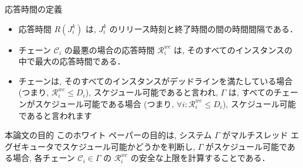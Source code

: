 \begin{frame}{応答時間の定義}
    \begin{itemize}
        \item 応答時間 $R\left(J_{i}^{k}\right)$ は,  $J_{i}^{k}$ のリリース時刻と終了時間の間の時間間隔である．
        \item チェーン $\mathcal{C}_{i}$ の最悪の場合の応答時間 $\mathcal{R}_{i}^{w c}$ は, そのすべてのインスタンスの中で最大の応答時間である．
        \item チェーンは, そのすべてのインスタンスがデッドラインを満たしている場合 (つまり, $\mathcal{R}_{i}^{w c} \leq D_{i}$), スケジュール可能であると言われ, $\Gamma$ は, すべてのチェーンがスケジュール可能である場合 (つまり, $\forall i: \mathcal{R}_{i}^{w c} \leq D_{i}$), スケジュール可能であると言われます
    \end{itemize}
\end{frame}

\begin{frame}{本論文の目的}
    このホワイト ペーパーの目的は, システム $\Gamma$ がマルチスレッド エグゼキュータでスケジュール可能かどうかを判断し, $\Gamma$ がスケジュール可能である場合, 各チェーン $\mathcal{C}_{i} \in \Gamma$ の $\mathcal{R}_{i}^{w c}$ の安全な上限を計算することである．
\end{frame}
